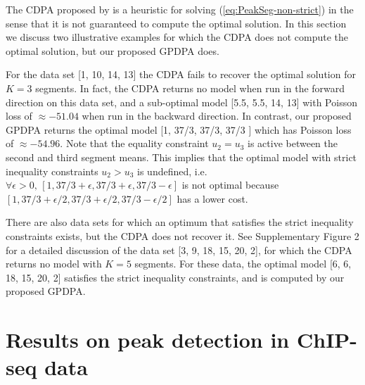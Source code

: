 \documentclass[twoside,11pt]{article}
\begin{document}
The CDPA proposed by \citep{HOCKING-PeakSeg} is a heuristic for
solving (\ref{eq:PeakSeg-non-strict}) in the sense that it is not
guaranteed to compute the optimal solution. In this section we discuss
two illustrative examples for which the CDPA does not compute the optimal
solution, but our proposed GPDPA does.

For the data set [1, 10, 14, 13] the CDPA fails to recover
the optimal solution for $K=3$ segments. In fact, the CDPA returns no
model when run in the forward direction on this data set, and a
sub-optimal model [5.5, 5.5, 14, 13] with Poisson loss of
$\approx -51.04$ when run in the backward direction. In contrast, our
proposed GPDPA returns the optimal model [1, 37/3, 37/3, 37/3 ] which
has Poisson loss of $\approx -54.96$. Note that the equality
constraint $u_2=u_3$ is active between the second and third segment
means. This implies that the optimal model with strict inequality
constraints $u_2>u_3$ is undefined, i.e. $\forall \epsilon>0,\, [1, 37/3
+ \epsilon, 37/3 + \epsilon, 37/3 - \epsilon]$ is not optimal because
$[1, 37/3 + \epsilon/2, 37/3 +\epsilon/2, 37/3 - \epsilon/2]$ has a
lower cost.

There are also data sets for which an optimum that satisfies the
strict inequality constraints exists, but the CDPA does not recover
it. See Supplementary Figure 2 for a detailed discussion of the data
set [3, 9, 18, 15, 20, 2], for which the CDPA returns no model with
$K=5$ segments. For these data, the optimal model [6, 6, 18, 15, 20,
2] satisfies the strict inequality constraints, and is computed by our
proposed GPDPA.

\section{Results on peak detection in ChIP-seq data}
\label{sec:results-chip-seq}
\label{sec:results}

\end{document}
